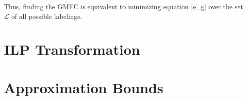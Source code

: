 \documentclass[11pt]{article}
\begin{document}
	Thus, finding the GMEC is equivalent to minimizing equation \ref{e_g}
	over the set $\mathcal{L}$ of all possible labelings. 
	
	\section{ILP Transformation}
	
	\section{Approximation Bounds}
\end{document}
